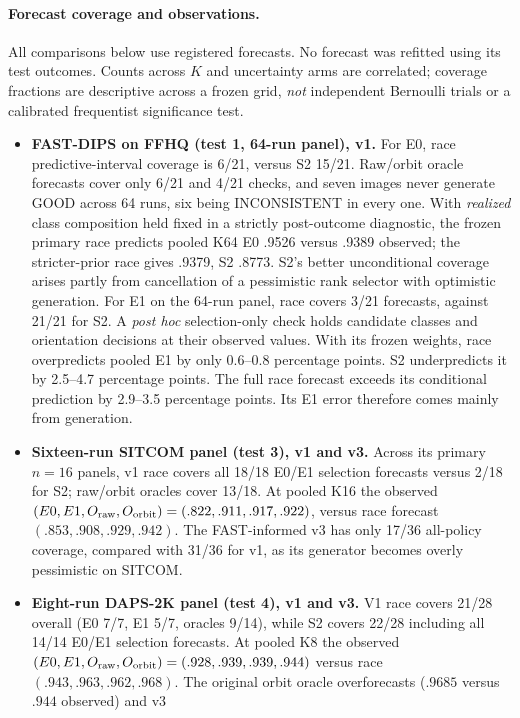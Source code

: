 \paragraph{Forecast coverage and observations.}
All comparisons below use registered forecasts.
No forecast was refitted using its test outcomes.
Counts across $K$ and uncertainty arms are correlated; coverage
fractions are descriptive across a frozen grid, \emph{not}
independent Bernoulli trials or a calibrated frequentist
significance test.
\begin{itemize}
\item \textbf{FAST-DIPS on FFHQ (test 1, 64-run panel), v1.}
For E0, race predictive-interval coverage is 6/21, versus S2
15/21. Raw/orbit oracle forecasts cover only 6/21 and 4/21 checks, and
seven images never generate GOOD across 64 runs, six being
INCONSISTENT in every one. With \emph{realized} class composition
held fixed in a strictly post-outcome diagnostic, the frozen primary
race predicts pooled K64 E0 .9526 versus .9389 observed;
the stricter-prior race gives .9379, S2 .8773. S2's better
unconditional coverage arises partly from cancellation of a
pessimistic rank selector with optimistic generation.
For E1 on the 64-run panel, race covers 3/21
forecasts, against 21/21 for S2.
A \emph{post hoc} selection-only check holds candidate classes
and orientation decisions at their observed values.
With its frozen weights, race overpredicts pooled E1 by
only 0.6--0.8 percentage points.
S2 underpredicts it by 2.5--4.7 percentage points.
The full race forecast exceeds its conditional prediction
by 2.9--3.5 percentage points.
Its E1 error therefore comes mainly from generation.
\item \textbf{Sixteen-run SITCOM panel (test 3), v1 and v3.}
Across its primary $n=16$ panels, v1 race covers all 18/18 E0/E1
selection forecasts versus 2/18 for S2; raw/orbit oracles
cover 13/18. At pooled K16 the observed
$(E0,E1,O_{\rm raw},O_{\rm orbit})=(.822,.911,.917,.922)$,
versus race forecast $(.853,.908,.929,.942)$. The FAST-informed
v3 has only 17/36 all-policy coverage, compared with 31/36
for v1, as its generator becomes overly pessimistic on SITCOM.
\item \textbf{Eight-run DAPS-2K panel (test 4), v1 and v3.}
V1 race covers 21/28 overall (E0 7/7, E1 5/7, oracles 9/14),
while S2 covers 22/28 including all 14/14 E0/E1 selection forecasts. At pooled K8 the observed
$(E0,E1,O_{\rm raw},O_{\rm orbit})=(.928,.939,.939,.944)$
versus race $(.943,.963,.962,.968)$. The original orbit
oracle overforecasts ($.9685$ versus $.944$ observed) and v3

\end{itemize}
